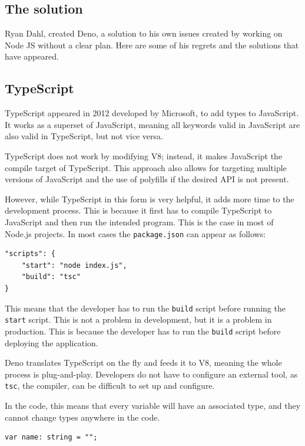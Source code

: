 \documentclass[12pt, letterpaper]{article}
\begin{document}
\begin{multicols}{2}
    \section{The solution}

    Ryan Dahl, created Deno, a solution to his own issues created by working on Node JS without a clear plan. Here are some of his regrets and the solutions that have appeared.

    \subsection{TypeScript}

    TypeScript appeared in 2012 developed by Microsoft, to add types to JavaScript. It works as a superset of JavaScript, meaning all keywords valid in JavaScript are also valid in TypeScript, but not vice versa. \cite{TypeScript}

    TypeScript does not work by modifying V8; instead, it makes JavaScript the compile target of TypeScript. This approach also allows for targeting multiple versions of JavaScript and the use of polyfills \cite{Polyfill} if the desired API is not present.

    However, while TypeScript in this form is very helpful, it adds more time to the development process. This is because it first has to compile TypeScript to JavaScript and then run the intended program. This is the case in most of Node.js projects. In most cases the \verb|package.json| can appear as follows:

    \begin{lstlisting}
"scripts": {
    "start": "node index.js",
    "build": "tsc"
}
    \end{lstlisting}

    This means that the developer has to run the \verb|build| script before running the \verb|start| script. This is not a problem in development, but it is a problem in production. This is because the developer has to run the \verb|build| script before deploying the application.

    Deno translates TypeScript on the fly and feeds it to V8, meaning the whole process is plug-and-play. Developers do not have to configure an external tool, as \verb|tsc|, the compiler, can be difficult to set up and configure.

    In the code, this means that every variable will have an associated type, and they cannot change types anywhere in the code.

    \begin{lstlisting}
var name: string = "";
    \end{lstlisting}


\end{multicols}
\end{document}
